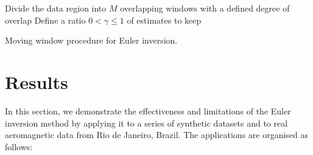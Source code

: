 \begin{algorithm}[!htb]
  Divide the data region into $M$ overlapping windows with a defined degree of
  overlap
  \;
  Define a ratio $0 < \gamma \le 1$ of estimates to keep
  \;
  \BlankLine
  \caption{Moving window procedure for Euler inversion.}
  \label{alg:window}
\end{algorithm}


\section{Results}

In this section, we demonstrate the effectiveness and limitations of the Euler
inversion method by applying it to a series of synthetic datasets and to real
aeromagnetic data from Rio de Janeiro, Brazil.
The applications are organised as follows:

